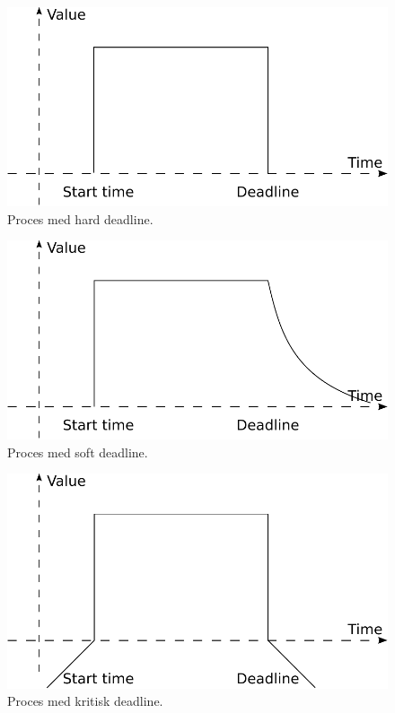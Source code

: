 \begin{figure}
 \begin{center}
  \includegraphics[scale=0.75]{images/hard-deadline}
	\caption{Proces med hard deadline.}
	\label{fig:hard-rtp}
\end{center}
\end{figure}

\begin{figure}
 \begin{center}
  \includegraphics[scale=0.75]{images/soft-deadline}
	\caption{Proces med soft deadline.}
	\label{fig:hard-rtp}
\end{center}
\end{figure}

\begin{figure}
 \begin{center}
  \includegraphics[scale=0.75]{images/critical-deadline}
	\caption{Proces med kritisk deadline.}
	\label{fig:hard-rtp}
\end{center}
\end{figure}

